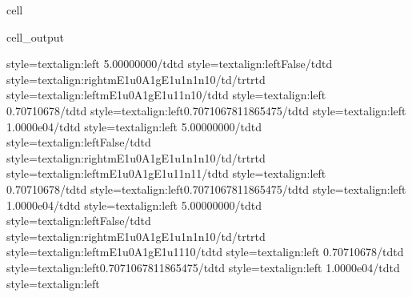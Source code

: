 \documentclass[letterpaper,table,10pt,english]{jupyterBook}
\begin{document}
\begin{sphinxuseclass}{cell}
\begin{sphinxVerbatimOutput}
\begin{sphinxuseclass}{cell_output}
\begin{sphinxVerbatim}[commandchars=\\\{\}]
style=\PYGZbs{}\PYGZsq{}text\PYGZhy{}align:left\PYGZbs{}\PYGZsq{}\PYGZgt{} 5.00000000\PYGZlt{}/td\PYGZgt{}\PYGZlt{}td style=\PYGZbs{}\PYGZsq{}text\PYGZhy{}align:left\PYGZbs{}\PYGZsq{}\PYGZgt{}False\PYGZlt{}/td\PYGZgt{}\PYGZlt{}td style=\PYGZbs{}\PYGZsq{}text\PYGZhy{}align:right\PYGZbs{}\PYGZsq{}\PYGZgt{}m\PYGZus{}E1u\PYGZus{}0\PYGZus{}A1g\PYGZus{}E1u\PYGZus{}1\PYGZus{}n1\PYGZus{}n1\PYGZus{}0\PYGZlt{}/td\PYGZgt{}\PYGZlt{}/tr\PYGZgt{}\PYGZlt{}tr\PYGZgt{}\PYGZlt{}td style=\PYGZbs{}\PYGZsq{}text\PYGZhy{}align:left\PYGZbs{}\PYGZsq{}\PYGZgt{}m\PYGZus{}E1u\PYGZus{}0\PYGZus{}A1g\PYGZus{}E1u\PYGZus{}1\PYGZus{}1\PYGZus{}n1\PYGZus{}0\PYGZlt{}/td\PYGZgt{}\PYGZlt{}td style=\PYGZbs{}\PYGZsq{}text\PYGZhy{}align:left\PYGZbs{}\PYGZsq{}\PYGZgt{} 0.70710678\PYGZlt{}/td\PYGZgt{}\PYGZlt{}td style=\PYGZbs{}\PYGZsq{}text\PYGZhy{}align:left\PYGZbs{}\PYGZsq{}\PYGZgt{}0.7071067811865475\PYGZlt{}/td\PYGZgt{}\PYGZlt{}td style=\PYGZbs{}\PYGZsq{}text\PYGZhy{}align:left\PYGZbs{}\PYGZsq{}\PYGZgt{} 1.0000e\PYGZhy{}04\PYGZlt{}/td\PYGZgt{}\PYGZlt{}td style=\PYGZbs{}\PYGZsq{}text\PYGZhy{}align:left\PYGZbs{}\PYGZsq{}\PYGZgt{} 5.00000000\PYGZlt{}/td\PYGZgt{}\PYGZlt{}td style=\PYGZbs{}\PYGZsq{}text\PYGZhy{}align:left\PYGZbs{}\PYGZsq{}\PYGZgt{}False\PYGZlt{}/td\PYGZgt{}\PYGZlt{}td style=\PYGZbs{}\PYGZsq{}text\PYGZhy{}align:right\PYGZbs{}\PYGZsq{}\PYGZgt{}m\PYGZus{}E1u\PYGZus{}0\PYGZus{}A1g\PYGZus{}E1u\PYGZus{}1\PYGZus{}n1\PYGZus{}n1\PYGZus{}0\PYGZlt{}/td\PYGZgt{}\PYGZlt{}/tr\PYGZgt{}\PYGZlt{}tr\PYGZgt{}\PYGZlt{}td style=\PYGZbs{}\PYGZsq{}text\PYGZhy{}align:left\PYGZbs{}\PYGZsq{}\PYGZgt{}m\PYGZus{}E1u\PYGZus{}0\PYGZus{}A1g\PYGZus{}E1u\PYGZus{}1\PYGZus{}1\PYGZus{}n1\PYGZus{}1\PYGZlt{}/td\PYGZgt{}\PYGZlt{}td style=\PYGZbs{}\PYGZsq{}text\PYGZhy{}align:left\PYGZbs{}\PYGZsq{}\PYGZgt{} 0.70710678\PYGZlt{}/td\PYGZgt{}\PYGZlt{}td style=\PYGZbs{}\PYGZsq{}text\PYGZhy{}align:left\PYGZbs{}\PYGZsq{}\PYGZgt{}0.7071067811865475\PYGZlt{}/td\PYGZgt{}\PYGZlt{}td style=\PYGZbs{}\PYGZsq{}text\PYGZhy{}align:left\PYGZbs{}\PYGZsq{}\PYGZgt{} 1.0000e\PYGZhy{}04\PYGZlt{}/td\PYGZgt{}\PYGZlt{}td style=\PYGZbs{}\PYGZsq{}text\PYGZhy{}align:left\PYGZbs{}\PYGZsq{}\PYGZgt{} 5.00000000\PYGZlt{}/td\PYGZgt{}\PYGZlt{}td style=\PYGZbs{}\PYGZsq{}text\PYGZhy{}align:left\PYGZbs{}\PYGZsq{}\PYGZgt{}False\PYGZlt{}/td\PYGZgt{}\PYGZlt{}td style=\PYGZbs{}\PYGZsq{}text\PYGZhy{}align:right\PYGZbs{}\PYGZsq{}\PYGZgt{}m\PYGZus{}E1u\PYGZus{}0\PYGZus{}A1g\PYGZus{}E1u\PYGZus{}1\PYGZus{}n1\PYGZus{}n1\PYGZus{}0\PYGZlt{}/td\PYGZgt{}\PYGZlt{}/tr\PYGZgt{}\PYGZlt{}tr\PYGZgt{}\PYGZlt{}td style=\PYGZbs{}\PYGZsq{}text\PYGZhy{}align:left\PYGZbs{}\PYGZsq{}\PYGZgt{}m\PYGZus{}E1u\PYGZus{}0\PYGZus{}A1g\PYGZus{}E1u\PYGZus{}1\PYGZus{}1\PYGZus{}1\PYGZus{}0\PYGZlt{}/td\PYGZgt{}\PYGZlt{}td style=\PYGZbs{}\PYGZsq{}text\PYGZhy{}align:left\PYGZbs{}\PYGZsq{}\PYGZgt{} 0.70710678\PYGZlt{}/td\PYGZgt{}\PYGZlt{}td style=\PYGZbs{}\PYGZsq{}text\PYGZhy{}align:left\PYGZbs{}\PYGZsq{}\PYGZgt{}0.7071067811865475\PYGZlt{}/td\PYGZgt{}\PYGZlt{}td style=\PYGZbs{}\PYGZsq{}text\PYGZhy{}align:left\PYGZbs{}\PYGZsq{}\PYGZgt{} 1.0000e\PYGZhy{}04\PYGZlt{}/td\PYGZgt{}\PYGZlt{}td style=\PYGZbs{}\PYGZsq{}text\PYGZhy{}align:left\PYGZbs{}\PYGZsq{}\PYGZgt{} 
\end{sphinxVerbatim}
\end{sphinxuseclass}
\end{sphinxVerbatimOutput}
\end{sphinxuseclass}
\end{document}
